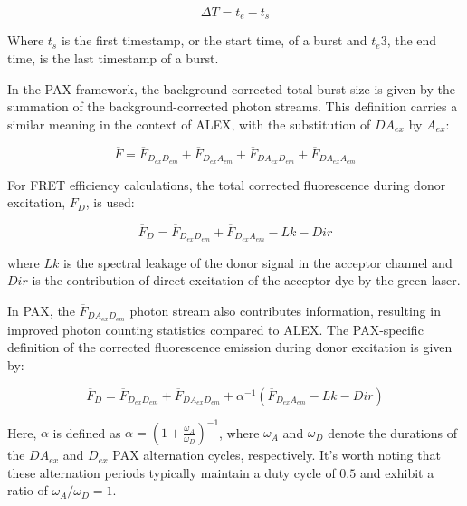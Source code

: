 \begin{equation}
\label{eqn:burst_def}
\Delta T = t_e - t_s
\end{equation}

\noindent
Where $t_s$ is the first timestamp, or the start time, of a burst and $t_e3$, the end time, is the last timestamp of a burst.

In the \ac{PAX} framework, the background-corrected total burst size is given by the summation of the background-corrected photon streams. 
This definition carries a similar meaning in the context of \ac{ALEX}, with the substitution of $DA_{ex}$ by $A_{ex}$:

\begin{equation}
\label{eqn:burst_size}
\overline{F} = \overline{F}_{D_{ex}D_{em}} + \overline{F}_{D_{ex}A_{em}} +\overline{F}_{DA_{ex}D_{em}} + \overline{F}_{DA_{ex}A_{em}}
\end{equation}

\noindent
For FRET efficiency calculations, the total corrected fluorescence during donor excitation, $\overline{F}_D$, is used: 

\begin{equation}
\label{eqn:total_Fd}
\overline{F}_D = \overline{F}_{D_{ex}D_{em}}+\overline{F}_{D_{ex}A_{em}} - Lk - Dir
\end{equation}

\noindent
where $Lk$ is the spectral leakage of the donor signal in the
acceptor channel and $Dir$ is the contribution of direct
excitation of the acceptor dye by the green laser. 

In PAX, the $\overline{F}_{DA_{ex}D_{em}}$ photon stream 
also contributes information, resulting in improved photon counting statistics
compared to \ac{ALEX}. 
The PAX-specific definition of the corrected fluorescence emission
during donor excitation is given by:

\begin{equation}
\label{eqn:corr_total_Fd}
\overline{F}_{D} = \overline{F}_{D_{ex}D_{em}} + \overline{F}_{DA_{ex}D_{em}} + \alpha^{-1}(\overline{F}_{D_{ex}A_{em}} - Lk - Dir)
\end{equation}

\noindent

Here, $\alpha$ is defined as $\alpha = \left(1 + \frac{\omega_A}{\omega_D}\right)^{-1}$, where $\omega_A$ and $\omega_D$ denote the durations of the $DA_{ex}$ and $D_{ex}$ \ac{PAX} alternation cycles, respectively. 
It's worth noting that these alternation periods typically maintain a duty cycle of $0.5$ and exhibit a ratio of $\omega_A / \omega_D = 1$.

